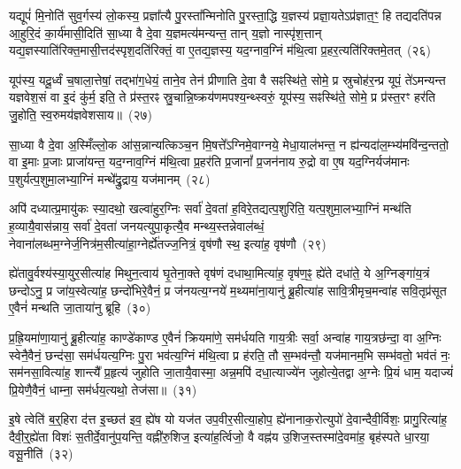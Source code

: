 यद्यूपं॑ मि॒नोति॑ सुव॒र्गस्य॑ लो॒कस्य॒ प्रज्ञा᳚त्यै पु॒रस्ता᳚न्मिनोति पु॒रस्ता॒द्धि य॒ज्ञस्य॑ प्रज्ञा॒यते\-ऽप्र॑ज्ञात॒ꣳ॒ हि तद्यदति॑पन्न आ॒हुरि॒दं का॒र्य॑मासी॒दिति॑ सा॒ध्या वै दे॒वा य॒ज्ञमत्य॑मन्यन्त॒ तान् य॒ज्ञो नास्पृ॑श॒त्तान् यद्य॒ज्ञस्याति॑रिक्त॒मासी॒त्तद॑स्पृश॒\-दति॑रिक्तं॒ वा ए॒तद्य॒ज्ञस्य॒ यद॒ग्नाव॒ग्निं म॑थि॒त्वा प्र॒हर॒त्यति॑रिक्तमे॒तत्~(२६)

यूप॑स्य॒ यदू॒र्ध्वं च॒षाला॒त्तेषां॒ तद्भा॑ग॒धेयं॒ ताने॒व तेन॑ प्रीणाति दे॒वा वै सꣴस्थि॑ते॒ सोमे॒ प्र स्रुचोह॑र॒न्प्र यूपं॒ ते॑\-ऽमन्यन्त यज्ञवेश॒सं वा इ॒दं कु॑र्म॒ इति॒ ते प्र॑स्त॒रꣴ स्रु॒चान्नि॒ष्क्रय॑णमपश्य॒न्थ्स्वरुं॒ यूप॑स्य॒ सꣴस्थि॑ते॒ सोमे॒ प्र प्र॑स्त॒रꣳ हर॑ति जु॒होति॒ स्व॒रुमय॑ज्ञवेशसाय॥~(२७)

{}%

सा॒ध्या वै दे॒वा अ॒स्मिँल्लो॒क आ॑स॒न्नान्यत्किञ्च॒न मि॒षत्ते᳚\-ऽग्निमे॒वाग्नये॒ मेधा॒याल॑भन्त॒ न ह्य॑न्यदा॑ल॒म्भ्य॑मवि॑न्द॒न्ततो॒ वा इ॒माः प्र॒जाः प्राजा॑यन्त॒ यद॒ग्नाव॒ग्निं म॑थि॒त्वा प्र॒हर॑ति प्र॒जानां᳚ प्र॒जन॑नाय रु॒द्रो वा ए॒ष यद॒ग्निर्यज॑मानः प॒शुर्यत्प॒शुमा॒लभ्या॒ग्निं मन्थे᳚द्रु॒द्राय॒ यज॑मानम्~(२८)

अपि॑ दध्यात्प्र॒मायु॑कः स्या॒दथो॒ खल्वा॑हुर॒ग्निः सर्वा॑ दे॒वता॑ ह॒विरे॒तद्यत्प॒शुरिति॒ यत्प॒शुमा॒लभ्या॒ग्निं मन्थ॑ति ह॒व्यायै॒वास॑न्नाय॒ सर्वा॑ दे॒वता॑ जनयत्युपा॒कृत्यै॒व मन्थ्य॒स्तन्नेवाल॑ब्धं॒ नेवाना॑लब्धम॒ग्नेर्ज॒नित्र॑म॒सीत्या॑हा॒ग्नेर्\mbox{}ह्ये॑तज्ज॒नित्रं॒ वृष॑णौ स्थ॒ इत्या॑ह॒ वृष॑णौ~(२९)

ह्ये॑तावु॒र्वश्य॑स्या॒युर॒सीत्या॑ह मिथुन॒त्वाय॑ घृ॒तेना॒क्ते वृष॑णं दधाथा॒मित्या॑ह॒ वृष॑ण॒ꣴ॒ ह्ये॑ते दधा॑ते॒ ये अ॒ग्निङ्गा॑य॒त्रं छन्दो\-ऽनु॒ प्र जा॑य॒स्वेत्या॑ह॒ छन्दो॑भिरे॒वैनं॒ प्र ज॑नयत्य॒ग्नये॑ म॒थ्यमा॑ना॒यानु॑ ब्रू॒हीत्या॑ह सावि॒त्रीमृच॒मन्वा॑ह सवि॒तृप्र॑सूत ए॒वैनं॑ मन्थति जा॒ताया॑नु ब्रूहि~(३०)

प्र॒ह्रि॒यमा॑णा॒यानु॑ ब्रू॒हीत्या॑ह॒ काण्डे॑काण्ड ए॒वैनं॑ क्रियमा॑णे॒ सम॑र्धयति गाय॒त्रीः सर्वा॒ अन्वा॑ह गाय॒त्रछ॑न्दा॒ वा अ॒ग्निः स्वेनै॒वैनं॒ छन्द॑सा॒ सम॑र्धयत्य॒ग्निः पु॒रा भव॑त्य॒ग्निं म॑थि॒त्वा प्र ह॑रति॒ तौ स॒म्भव॑न्तौ॒ यज॑मानम॒भि सम्भ॑वतो॒ भव॑तं नः॒ सम॑नसा॒वित्या॑ह॒ शान्त्यै᳚ प्र॒हृत्य॑ जुहोति जा॒तायै॒वास्मा॒ अन्न॒मपि॑ दधा॒त्याज्ये॑न जुहोत्ये॒तद्वा अ॒ग्नेः प्रि॒यं धाम॒ यदाज्यं॑ प्रि॒येणै॒वैनं॒ धाम्ना॒ सम॑र्धय॒त्यथो॒ तेज॑सा॥~(३१)

{\anuvakamend[{यज॑मानमाह॒ वृष॑णौ जाता॒यानु॑ब्रू॒ह्यप्य॒ष्टाद॑श च}]}%

इ॒षे त्वेति॑ ब॒र्॒\mbox{}हिरा द॑त्त इ॒च्छत॑ इव॒ ह्ये॑ष यो यज॑त उप॒वीर॒सीत्या॒होप॒ ह्ये॑नानाक॒रोत्युपो॑ दे॒वान्दैवी॒र्विशः॒ प्रागु॒रित्या॑ह॒ दैवी॒र्॒\mbox{}ह्ये॑ता विशः॑ स॒तीर्दे॒वानु॑प॒यन्ति॒ वह्नी॑रु॒शिज॒ इत्या॑ह॒र्त्विजो॒ वै वह्न॑य उ॒शिज॒स्तस्मा॑दे॒वमा॑ह॒ बृह॑स्पते धा॒रया॒ वसू॒नीति॑~(३२)

